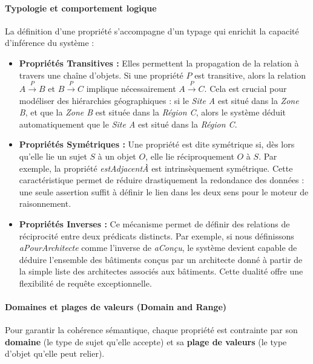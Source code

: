 \documentclass{article}
\begin{document}
\paragraph{Typologie et comportement logique}
La définition d'une propriété s'accompagne d'un typage qui enrichit la capacité d'inférence du système :

\begin{itemize}
    \item \textbf{Propriétés Transitives :} Elles permettent la propagation de la relation à travers une chaîne d'objets. Si une propriété $P$ est transitive, alors la relation $A \xrightarrow{P} B$ et $B \xrightarrow{P} C$ implique nécessairement $A \xrightarrow{P} C$. Cela est crucial pour modéliser des hiérarchies géographiques : si le \textit{Site A} est situé dans la \textit{Zone B}, et que la \textit{Zone B} est située dans la \textit{Région C}, alors le système déduit automatiquement que le \textit{Site A} est situé dans la \textit{Région C}.
    
    \item \textbf{Propriétés Symétriques :} Une propriété est dite symétrique si, dès lors qu'elle lie un sujet $S$ à un objet $O$, elle lie réciproquement $O$ à $S$. Par exemple, la propriété \textit{estAdjacentÀ} est intrinsèquement symétrique. Cette caractéristique permet de réduire drastiquement la redondance des données : une seule assertion suffit à définir le lien dans les deux sens pour le moteur de raisonnement.

    \item \textbf{Propriétés Inverses :} Ce mécanisme permet de définir des relations de réciprocité entre deux prédicats distincts. Par exemple, si nous définissons \textit{aPourArchitecte} comme l'inverse de \textit{aConçu}, le système devient capable de déduire l'ensemble des bâtiments conçus par un architecte donné à partir de la simple liste des architectes associés aux bâtiments. Cette dualité offre une flexibilité de requête exceptionnelle.
\end{itemize}



\paragraph{Domaines et plages de valeurs (Domain and Range)}
Pour garantir la cohérence sémantique, chaque propriété est contrainte par son \textbf{domaine} (le type de sujet qu'elle accepte) et sa \textbf{plage de valeurs} (le type d'objet qu'elle peut relier). 
\end{document}
